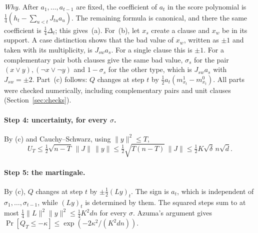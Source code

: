 \documentclass[11pt,a4paper]{article}
\theoremstyle{definition}
\theoremstyle{remark}
\begin{document}
\noindent\emph{Why.} After $a_1,\dots,a_{t-1}$ are fixed, the coefficient of
$a_t$ in the score polynomial is $\frac14(h_t-\sum_{u<t}J_{tu}a_u)$. The
remaining formula is canonical, and there the same coefficient is
$\frac14\Delta_t$; this gives~(a). For~(b), let $x_s$ create a clause and $x_w$
be in its support. A case distinction shows that the bad value of $x_w$,
written as $\pm1$ and taken with its multiplicity, is $J_{sw}a_s$. For a single
clause this is $\pm1$. For a complementary pair both clauses give the same bad
value, $\sigma_s$ for the pair $(x\lor y),(\neg x\lor\neg y)$ and
$1-\sigma_s$ for the other type, which is $J_{sw}a_s$ with $J_{sw}=\pm2$.
Part~(c) follows: $Q$ changes at step $t$ by $\frac12a_t(m^1_{x_t}-m^0_{x_t})$.
All parts were checked numerically, including complementary pairs and unit
clauses (Section~\ref{sec:checks}).

\paragraph{Step 4: uncertainty, for every $\sigma$.} By (c) and
Cauchy--Schwarz, using $\|y\|^2\le T$,
\[
 U_T\le\tfrac12\sqrt{n-T}\,\|J\|\,\|y\|\le\tfrac12\sqrt{T(n-T)}\,\|J\|
 \le\tfrac12K\sqrt{\delta}\,n\sqrt d .
\]

\paragraph{Step 5: the martingale.} By (c), $Q$ changes at step $t$ by
$\pm\frac12(Ly)_t$. The sign is $a_t$, which is independent of
$\sigma_1,\dots,\sigma_{t-1}$, while $(Ly)_t$ is determined by them. The squared
steps sum to at most $\frac14\|L\|^2\|y\|^2\le\frac14K^2dn$ for every $\sigma$.
Azuma's argument gives
$\Pr[Q_T\le-\kappa]\le\exp(-2\kappa^2/(K^2dn))$.
\end{document}
